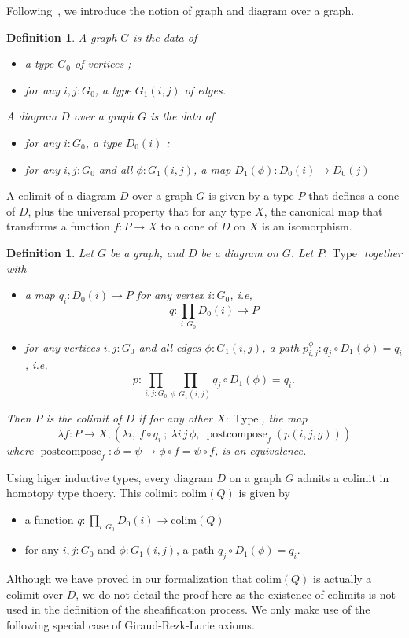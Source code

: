 \documentclass[conference]{IEEEtran}
\newtheorem{defi}[thm]{Definition}
\newcommand{\ie}{i.e,\xspace}
\DeclareMathOperator{\Type}{Type}
\DeclareMathOperator{\postcompose}{\mathrm{postcompose}}
\newcommand \colim[1] {\mathrm{colim}(Q)}
\begin{document}
Following~\cite{lumsdaine}, we introduce the notion of graph and
diagram over a graph.
%
\begin{defi}
  A {\em graph} $G$ is the data of
  \begin{itemize}
  \item a type $G_0$ of vertices ;
  \item for any $i,j:G_0$, a type $G_1(i,j)$ of edges.
  \end{itemize}

  A {\em diagram} $D$ over a graph $G$ is the data of
  \begin{itemize}
  \item for any $i:G_0$, a type $D_0(i)$ ;
  \item for any $i,j:G_0$ and all $\phi : G_1(i,j)$, a map $D_1(\phi)
    : D_0(i) \to D_0(j)$
  \end{itemize}
\end{defi}

A colimit of a diagram $D$ over a graph $G$ is given by a type $P$
that defines a cone of $D$, plus the universal property that for any
type $X$, the canonical map that transforms a function $f : P
\rightarrow X$ to a cone of $D$ on $X$ is an isomorphism.
% 
\begin{defi}
Let $G$ be a graph, and $D$ be a diagram on $G$. 
Let $P:\Type$ together with
\begin{itemize}
\item a map $q_i : D_0(i) \to P$ for any
vertex $i:G_0$, \ie $$q : \prod_{i:G_0} D_0(i) \to P$$
\item for any vertices $i,j:G_0$ and all edges $\phi:G_1(i,j)$, a path
  $p_{i,j}^\phi : q_j \circ D_1(\phi) = q_i$, \ie
  $$p : \prod_{i,j:G_0} \prod_{\phi:G_1(i,j)} q_j \circ D_1(\phi) = q_i.$$
\end{itemize}

Then $P$ is the {\em colimit} of $D$ if for any other $X:\Type$, the
map
$$\lambda f:P \to X, \left( \lambda i,~f \circ q_i~;~ \lambda i\, j\,
  \phi,~ \postcompose_f (p(i, j, g)) \right)$$
where $\postcompose_f : \phi = \psi \to \phi \circ f = \psi \circ f$,
is an equivalence.
\end{defi}


Using higer inductive types, every diagram $D$ on a graph $G$ admits a
colimit in homotopy type thoery. This colimit $\colim D$ is given by
%
\begin{itemize}
\item a function $q:\prod_{i:G_0} D_0(i) \to \colim D$
\item for any $i,j:G_0$ and $\phi:G_1(i,j)$, a path
  $q_j \circ D_1(\phi) = q_i$.
\end{itemize}
%
Although we have proved in our formalization that $\colim D$ is
actually a colimit over $D$, we do not detail the proof here as the
existence of colimits is not used in the definition of the
sheafification process. We only make use of the following special case
of Giraud-Rezk-Lurie axioms.
\end{document}

